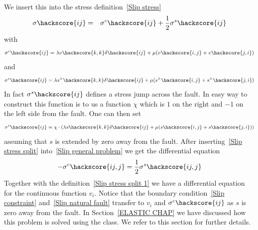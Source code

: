 We insert this into the stress definition~\ref{Slip  stress}
\begin{eqnarray} \label{Slip  stress split}
\sigma\hackscore{ij} & = &
\sigma^c\hackscore{ij} + 
\frac{1}{2} \sigma^s\hackscore{ij}
\end{eqnarray}
 with 
\begin{eqnarray} \label{Slip  stress split 1 }
\sigma^c\hackscore{ij} = \lambda v\hackscore{k,k} \delta\hackscore{ij} + \mu ( v\hackscore{i,j} + v\hackscore{j,i})
\end{eqnarray}
and 
\begin{eqnarray} \label{Slip  stress split 2 }
\sigma^s\hackscore{ij} = \lambda s^{\pm}\hackscore{k,k} \delta\hackscore{ij} + \mu ( s^{\pm}\hackscore{i,j} + s^{\pm}\hackscore{j,i})
\end{eqnarray}
In fact $\sigma^s\hackscore{ij}$ defines a stress jump across the fault. In easy way to construct this 
function is to us a function $\chi$ which is $1$ on the right and $-1$ on the left side from the fault. One can then
set 
\begin{eqnarray} \label{Slip  stress split 23 }
\sigma^s\hackscore{ij} = \chi \cdot  ( \lambda s\hackscore{k,k} \delta\hackscore{ij} + \mu ( s\hackscore{i,j} + s\hackscore{j,i}) )
\end{eqnarray}
assuming that $s$ is extended by zero away from the fault. After inserting~\ref{Slip  stress split} into~\ref{Slip general problem} we get the differential equation
\begin{eqnarray}\label{Slip general problem 2 }
- \sigma^c\hackscore{ij,j}=\frac{1}{2} \sigma^s\hackscore{ij,j}
\end{eqnarray}
Together with the definition~\ref{Slip  stress split 1} we have a differential equation for the
continuous function $v_i$. Notice that the boundary condition~\ref{Slip constraint}
and~\ref{Slip natural fault} transfer to $v_i$ and $\sigma^c\hackscore{ij}$ as 
$s$ is zero away from the fault. In Section~\ref{ELASTIC CHAP} we have discussed how this problem
is solved using the \LinearPDE class. We refer to this section for further details. 

